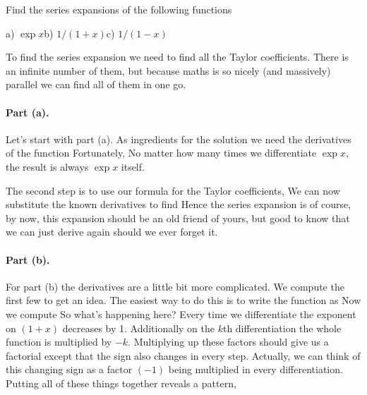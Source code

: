 \label{exGeneratingExSeries}
Find the series expansions of the following functions
\begin{center}
a) $\exp{x}$\qqq  b) $1/(1+x)$\qqq c) $1/(1-x)$ 
\end{center}

\solution
To find the series expansion we need to find all the Taylor coefficients. There is an infinite number of them, but because maths is so nicely (and massively) parallel we can find all of them in one go. 

\paragraph{Part (a).}Let's start with part (a). As ingredients for the solution we need the derivatives of the function 
Fortunately,
No matter how many times we differentiate $\exp{x}$, the result is always $\exp{x}$ itself. 

The second step is to use our formula for the Taylor coefficients,
We can now substitute the known derivatives
to find
Hence the series expansion is 
of course, by now, this expansion should be an old friend of yours, but good to know that we can just derive again should we ever forget it. 

\paragraph{Part (b).}For part (b) the derivatives are a little bit more complicated. We compute the first few to get an idea. The easiest way to do this is to write the function as 
Now we compute 
So what's happening here? Every time we differentiate the exponent on $(1+x)$ decreases by 1. Additionally on the $k$th differentiation the whole function is multiplied by $-k$. Multiplying up these factors should give us a factorial except that the sign also changes in every step. Actually, we can think of this changing sign as a factor $(-1)$ being multiplied in every differentiation. Putting all of these things together reveals a pattern,

